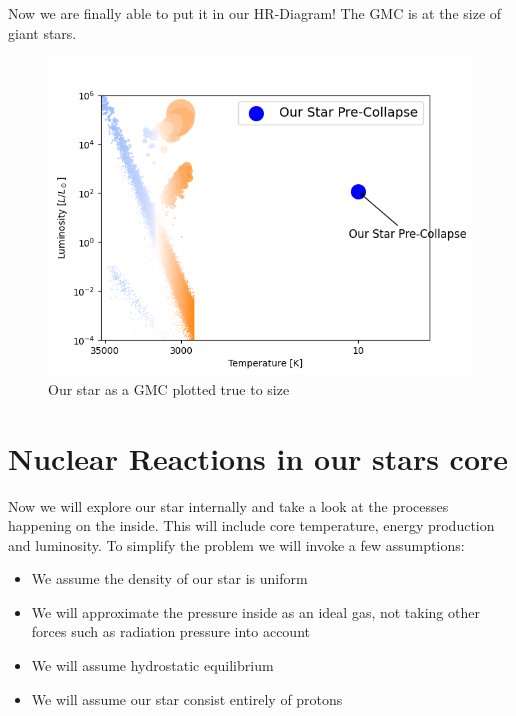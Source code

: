 \documentclass[reprint,english,notitlepage]{revtex4-2}
\begin{document}
Now we are finally able to put it in our HR-Diagram! The GMC is at the size of giant stars. 
\begin{figure}[h!]
  \centering
  \includegraphics[scale = .5]{figures/HR_diagram_Pre-Collapse}
  \caption{Our star as a GMC plotted true to size}
  \label{fig:figure1}
\end{figure}

\section{Nuclear Reactions in our stars core}
Now we will explore our star internally and take a look at the processes happening on the inside. This will include core temperature, energy production and luminosity. To simplify the problem we will invoke a few assumptions: 
\begin{itemize}
  \item We assume the density of our star is uniform
  \item We will approximate the pressure inside as an ideal gas, not taking other forces such as radiation pressure into account
  \item We will assume hydrostatic equilibrium
  \item We will assume our star consist entirely of protons 
\end{itemize}
\end{document}

